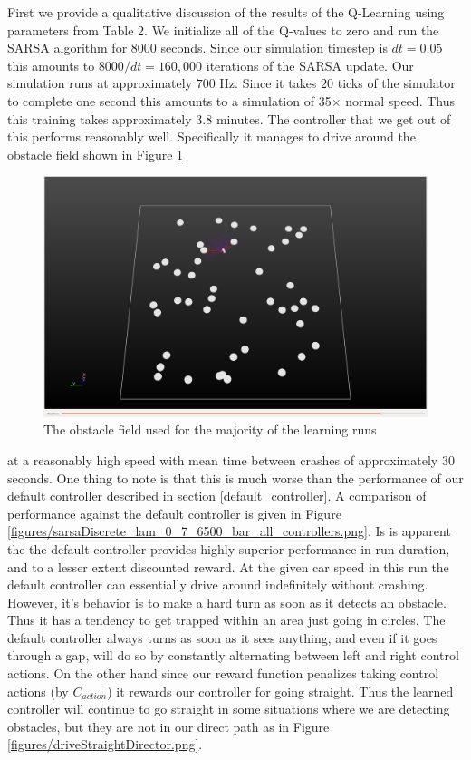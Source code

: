 \documentclass{article}
\begin{document}
%
%
%
%
First we provide a qualitative discussion of the results of the Q-Learning using parameters from Table 2. We initialize all of the Q-values to zero and run the SARSA algorithm for 8000 seconds. Since our simulation timestep is $dt = 0.05$ this amounts to $8000/dt = 160,000$ iterations of the SARSA update. Our simulation runs at approximately $700$ Hz. Since it takes $20$ ticks of the simulator to complete one second this amounts to a simulation of 35$\times$ normal speed. Thus this training takes approximately $3.8$ minutes. The controller that we get out of this performs reasonably well. Specifically it manages to drive around the obstacle field shown in Figure \ref{figures/director.png}
%
%
\begin{figure}
\centering
\includegraphics[scale=0.2]{figures/director.png}
\caption{The obstacle field used for the majority of the learning runs}
\label{figures/director.png}
\end{figure}
%
%
 at a reasonably high speed with mean time between crashes of approximately 30 seconds. One thing to note is that this is much worse than the performance of our default controller described in section \ref{default_controller}. A comparison of performance against the default controller is given in Figure \ref{figures/sarsaDiscrete_lam_0_7_6500_bar_all_controllers.png}. Is is apparent the the default controller provides highly superior performance in run duration, and to a lesser extent discounted reward. At the given car speed in this run the default controller can essentially drive around indefinitely without crashing. However, it's behavior is to make a hard turn as soon as it detects an obstacle. Thus it has a tendency to get trapped within an area just going in circles. The default controller always turns as soon as it sees anything, and even if it goes through a gap, will do so by constantly alternating between left and right control actions. On the other hand since our reward function penalizes taking control actions (by $C_{action}$) it rewards our controller for going straight. Thus the learned controller will continue to go straight in some situations where we are detecting obstacles, but they are not in our direct path as in Figure \ref{figures/driveStraightDirector.png}.
\end{document}
